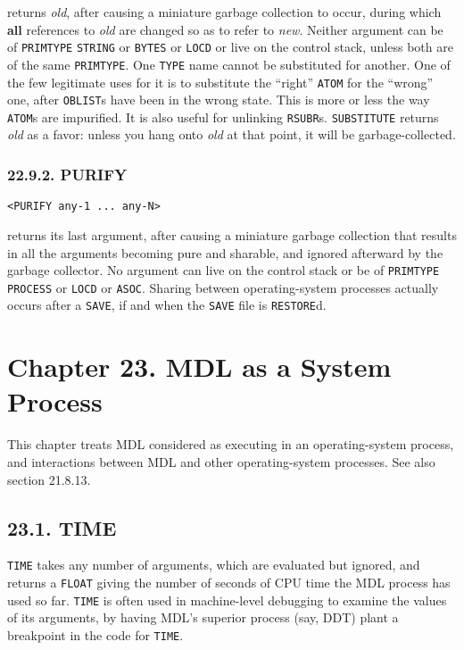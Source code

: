 \documentclass[a4paper,]{article}
\begin{document}
 returns \emph{old}, after causing a miniature garbage collection to occur, during which
\textbf{all} references to \emph{old} are changed so as to refer to \emph{new}. Neither argument can be of
\texttt{PRIMTYPE} \texttt{STRING} or \texttt{BYTES} or \texttt{LOCD} or live on the control stack, unless both are of the
same \texttt{PRIMTYPE}. One \texttt{TYPE} name cannot be substituted for another. One of the few legitimate uses for it is
to substitute the ``right'' \texttt{ATOM} for the ``wrong'' one, after \texttt{OBLIST}s have been in the wrong state. This
is more or less the way \texttt{ATOM}s are impurified. It is also useful for unlinking \texttt{RSUBR}s. \texttt{SUBSTITUTE}
returns \emph{old} as a favor: unless you hang onto \emph{old} at that point, it will be garbage-collected.

\subsubsection{22.9.2. PURIFY}\label{purify}

\begin{verbatim}
<PURIFY any-1 ... any-N>
\end{verbatim}

 returns its last argument, after causing a miniature garbage collection that results in all
the arguments becoming pure and sharable, and ignored afterward by the garbage collector. No argument can live on the
control stack or be of \texttt{PRIMTYPE} \texttt{PROCESS} or \texttt{LOCD} or \texttt{ASOC}. Sharing between
operating-system processes actually occurs after a \texttt{SAVE}, if and when the \texttt{SAVE} file
is \texttt{RESTORE}d.

\section{Chapter 23. MDL as a System Process}\label{chapter-23.-mdl-as-a-system-process}

This chapter treats MDL considered as executing in an operating-system process, and interactions between MDL and other
operating-system processes. See also section 21.8.13.

\subsection{23.1. TIME}\label{time}

\texttt{TIME} takes any number of arguments, which are evaluated but ignored, and returns a
\texttt{FLOAT} giving the number of seconds of CPU time the MDL process has used so far. \texttt{TIME} is often used in
machine-level debugging to examine the values of its arguments, by having MDL's superior process (say, DDT) plant a
breakpoint in the code for \texttt{TIME}.
\end{document}
